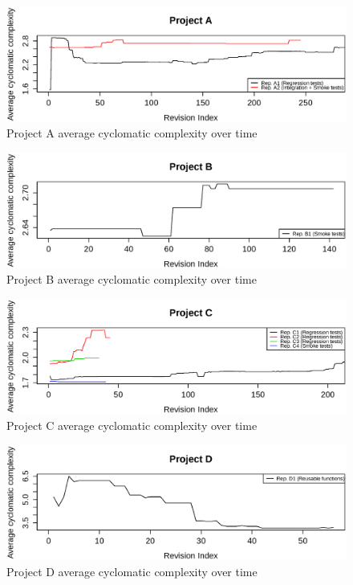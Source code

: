     
\begin{figure}[!htbp]
    \centering
    \includegraphics[width=\textwidth,keepaspectratio]{figure/results/rq1/project_a_avg_complexity.eps}
    \caption{Project A average cyclomatic complexity over time}
    \label{fig:project_a_avg_complexity}
\end{figure}

\begin{figure}[!htbp]
    \centering
    \includegraphics[width=\textwidth,keepaspectratio]{figure/results/rq1/project_b_avg_complexity.eps}
    \caption{Project B average cyclomatic complexity over time}
    \label{fig:project_b_avg_complexity}
\end{figure}

\begin{figure}[!htbp]
    \centering
    \includegraphics[width=\textwidth,keepaspectratio]{figure/results/rq1/project_c_avg_complexity.eps}
    \caption{Project C average cyclomatic complexity over time}
    \label{fig:project_c_avg_complexity}
\end{figure}

\begin{figure}[!htbp]
    \centering
    \includegraphics[width=\textwidth,keepaspectratio]{figure/results/rq1/project_d_avg_complexity.eps}
    \caption{Project D average cyclomatic complexity over time}
    \label{fig:project_d_avg_complexity}
\end{figure}

